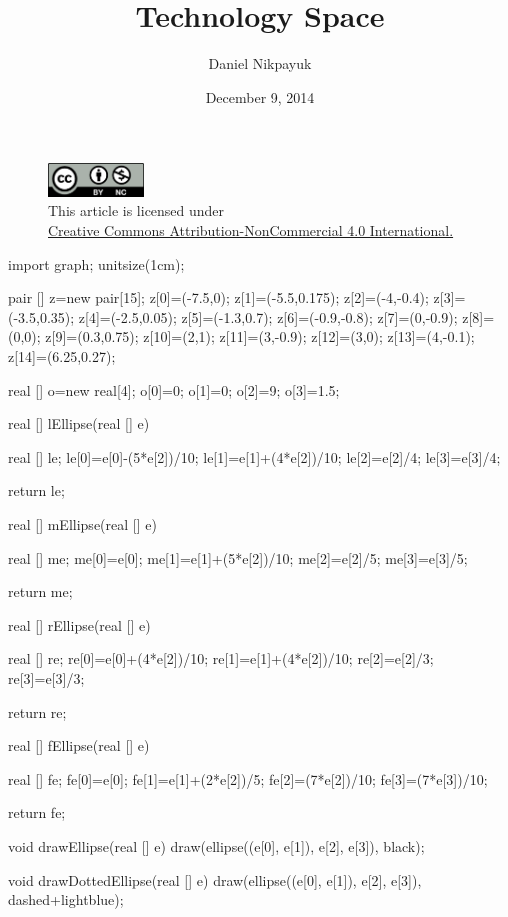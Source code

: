 \documentclass[twoside]{article}
\title{Technology Space}
\author{Daniel Nikpayuk}
\date{December 9, 2014}
\begin{document}
\maketitle
\thispagestyle{empty}

\begin{figure}[h]
\centering
\includegraphics[width=1in]{cc-by-nc.png}\\[0.1in]
\tiny This article is licensed under \\
\href{http://creativecommons.org/licenses/by-nc/4.0/}
{Creative Commons Attribution-NonCommercial 4.0 International.}\\[0.3in]
\end{figure}

\newpage

\begin{asydef}
import graph;
unitsize(1cm);

pair [] z=new pair[15];
z[0]=(-7.5,0);
z[1]=(-5.5,0.175);
z[2]=(-4,-0.4);
z[3]=(-3.5,0.35);
z[4]=(-2.5,0.05);
z[5]=(-1.3,0.7);
z[6]=(-0.9,-0.8);
z[7]=(0,-0.9);
z[8]=(0,0);
z[9]=(0.3,0.75);
z[10]=(2,1);
z[11]=(3,-0.9);
z[12]=(3,0);
z[13]=(4,-0.1);
z[14]=(6.25,0.27);

real [] o=new real[4];
o[0]=0;
o[1]=0;
o[2]=9;
o[3]=1.5;

real [] lEllipse(real [] e)
{
	real [] le;
	le[0]=e[0]-(5*e[2])/10;
	le[1]=e[1]+(4*e[2])/10;
	le[2]=e[2]/4;
	le[3]=e[3]/4;

	return le;
}

real [] mEllipse(real [] e)
{
	real [] me;
	me[0]=e[0];
	me[1]=e[1]+(5*e[2])/10;
	me[2]=e[2]/5;
	me[3]=e[3]/5;

	return me;
}

real [] rEllipse(real [] e)
{
	real [] re;
	re[0]=e[0]+(4*e[2])/10;
	re[1]=e[1]+(4*e[2])/10;
	re[2]=e[2]/3;
	re[3]=e[3]/3;

	return re;
}

real [] fEllipse(real [] e)
{
	real [] fe;
	fe[0]=e[0];
	fe[1]=e[1]+(2*e[2])/5;
	fe[2]=(7*e[2])/10;
	fe[3]=(7*e[3])/10;

	return fe;
}

void drawEllipse(real [] e)
{
	draw(ellipse((e[0], e[1]), e[2], e[3]), black);
}

void drawDottedEllipse(real [] e)
{
	draw(ellipse((e[0], e[1]), e[2], e[3]), dashed+lightblue);
}

\end{asydef}
\end{document}
